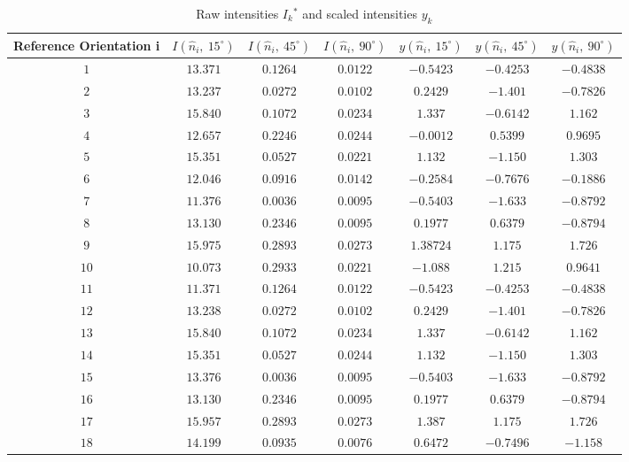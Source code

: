 \documentclass[final, 3p]{elsarticle}
\begin{document}
\newpage
\begin{table}[h]
	\label{tab:A2}
	\begin{center}
		\caption{Raw intensities $I_k$$^*$ and scaled intensities $y_k$}
		\begin{tabular}{|c|c|c|c|c|c|c|}
			\hline\hline
			Reference Orientation i  & $I(\hat{n}_i,\ 15^{\circ})$ &  $I(\hat{n}_i, \ 45^{\circ})$ &  $I(\hat{n}_i,\ 90^{\circ})$ & $y(\hat{n}_i, \ 15^{\circ})$ & $y(\hat{n}_i, \ 45^{\circ})$ & $y(\hat{n}_i, \ 90^{\circ})$ \\
			\hline
			$1$ & $13.371$ & $0.1264$ & $0.0122$ & $-0.5423$ & $-0.4253$ & $-0.4838$ \\
			$2$ & $13.237$ & $0.0272$ & $0.0102$ & $0.2429$ & $-1.401$ & $-0.7826$ \\
			$3$ & $15.840$ & $0.1072$ & $0.0234$ & $1.337$ &$-0.6142$&	$1.162$ \\
			$4$ & $12.657$ & $0.2246$ & $0.0244$ & $-0.0012$ &	$0.5399$ & $0.9695$ \\
			$5$ & $15.351$ & $0.0527$ & $0.0221$ & $1.132$ &	$-1.150$ & $1.303$ \\
			$6$ & $12.046$ & $0.0916$ & $0.0142$ & $-0.2584$ &	$-0.7676$ &	$-0.1886$ \\
			$7$ & $11.376$ & $0.0036$ & $0.0095$ & $-0.5403$ &$-1.633$ & $-0.8792$ \\
			$8$ & $13.130$ & $0.2346$ & $0.0095$ & $0.1977$ & $0.6379$ & $-0.8794$ \\
			$9$ & $15.975$ & $0.2893$ & $0.0273$ & $1.38724$ & $1.175$ & $1.726$ \\
			$10$ & $10.073$ & $0.2933$ & $0.0221$ & $-1.088$	& $1.215$ & $0.9641$ \\
			$11$ & $11.371$ & $0.1264$ & $0.0122$ & $-0.5423$ & $-0.4253$ & $-0.4838$ \\
			$12$ & $13.238$ & $0.0272$ & $0.0102$ & $0.2429$ &	$-1.401$ & $-0.7826$ \\
			$13$ & $15.840$ & $0.1072$ & $0.0234$ & $1.337$ &	$-0.6142$ & $1.162$ \\
			$14$ & $15.351$ & $0.0527$ & $0.0244$ & $1.132$ & $-1.150$ & $1.303$ \\
			$15$ & $13.376$ & $0.0036$ & $0.0095$ & $-0.5403$ & $-1.633$ & $-0.8792$ \\
			$16$ & $13.130$ & $0.2346$ & $0.0095$ & $0.1977$ & $0.6379$ & $-0.8794$ \\
			$17$ & $15.957$ & $0.2893$ & $0.0273$ & $1.387$	& $1.175$	& $1.726$ \\
			$18$ & $14.199$ & $0.0935$ & $0.0076$ & $0.6472$ & $-0.7496$ & $-1.158$ \\

\end{tabular}
\end{center}
\end{table}
\end{document}
